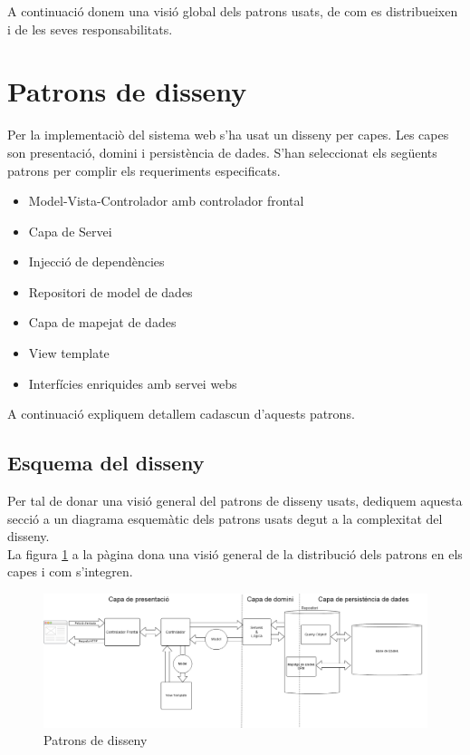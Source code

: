 A continuació donem una visió global dels patrons usats, de com es distribueixen i de les seves responsabilitats.

\section{Patrons de disseny}
Per la implementaci\`{o} del sistema web s'ha usat un disseny per capes. Les capes son presentaci\'{o}, domini i persistència de dades. S'han seleccionat els següents patrons per complir els requeriments especificats.
  \begin{itemize}
  \item Model-Vista-Controlador amb controlador frontal
  \item Capa de Servei
  \item Injecci\'{o} de depend\`{e}ncies
  \item Repositori de model de dades
  \item Capa de mapejat de dades
  \item View template
  \item Interfícies enriquides amb servei webs
  \end{itemize}
A continuació expliquem detallem cadascun d'aquests patrons.

\subsection{Esquema del disseny}
\label{subsec:dessigndiagram}
Per tal de donar una visió general del patrons de disseny usats, dediquem aquesta secció a un diagrama esquemàtic dels patrons usats degut a la complexitat del disseny.\\

La figura \ref{fig:dessignpatters} a la p\`{a}gina \pageref{fig:dessignpatters} dona una visió general de la distribució dels patrons en els capes i com s'integren.\\
\begin{figure}
  \includegraphics[scale=0.4]{img/design/IchnaeaPatterns.png}
  \caption{Patrons de disseny}
  \label{fig:dessignpatters}
\end{figure}

